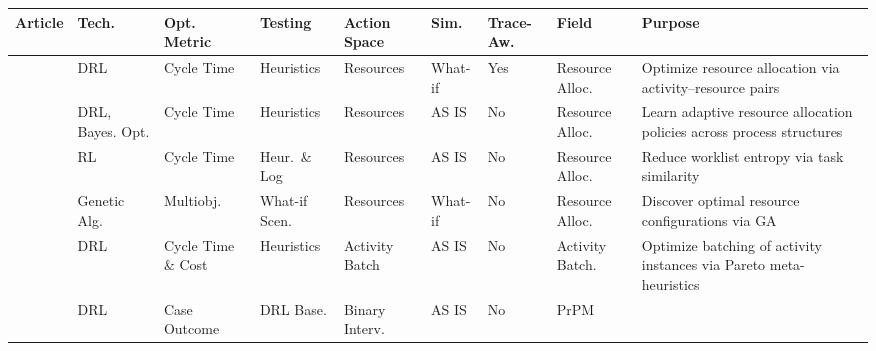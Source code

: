 \documentclass[journal,onecolumn]{IEEEtran}
\begin{document}
\begin{table}[!htbp]
\centering
\footnotesize
\setlength{\tabcolsep}{2pt}
\renewcommand{\arraystretch}{1.05}
\begin{tabularx}{\textwidth}{|>{\raggedright\arraybackslash}p{2.0cm}
                             |>{\raggedright\arraybackslash}p{1.3cm}
                             |>{\raggedright\arraybackslash}p{1.2cm}
                             |>{\raggedright\arraybackslash}p{1.3cm}
                             |>{\raggedright\arraybackslash}p{1.3cm}
                             |>{\raggedright\arraybackslash}p{1.2cm}
                             |>{\raggedright\arraybackslash}p{0.9cm}
                             |>{\raggedright\arraybackslash}p{1.2cm}
                             |>{\raggedright\arraybackslash}X|}
\hline
\textbf{Article} &
\textbf{Tech.} &
\textbf{Opt. Metric} &
\textbf{Testing} &
\textbf{Action Space} &
\textbf{Sim.} &
\textbf{Trace-Aw.} &
\textbf{Field} &
\textbf{Purpose} \\ \hline
\textbf{\citeauthor{Optimizing_Resource_Allocation_Policies}~\cite{Optimizing_Resource_Allocation_Policies}} &
DRL & Cycle Time & Heuristics & Resources & What-if & Yes & Resource Alloc. &
Optimize resource allocation via activity--resource pairs \\ \hline
\textbf{\citeauthor{Learning_policies_drl}~\cite{Learning_policies_drl}} &
DRL, Bayes. Opt. & Cycle Time & Heuristics & Resources & AS IS & No & Resource Alloc. &
Learn adaptive resource allocation policies across process structures \\ \hline
\textbf{\citeauthor{Resource_allocation_using_task_similarity}~\cite{Resource_allocation_using_task_similarity}} &
RL & Cycle Time & Heur.\ \& Log & Resources & AS IS & No & Resource Alloc. &
Reduce worklist entropy via task similarity \\ \hline
\textbf{\citeauthor{genetic_resource_allocations}~\cite{genetic_resource_allocations}} &
Genetic Alg. & Multiobj. & What-if Scen. & Resources & What-if & No & Resource Alloc. &
Discover optimal resource configurations via GA \\ \hline
\textbf{\citeauthor{Optimization_of_Activity_Batching_Policies}~\cite{Optimization_of_Activity_Batching_Policies}} &
DRL & Cycle Time \& Cost & Heuristics & Activity Batch & AS IS & No & Activity Batch. &
Optimize batching of activity instances via Pareto meta-heuristics \\ \hline
\textbf{\citeauthor{ppm_resource_constraints}~\cite{ppm_resource_constraints}} &
DRL & Case Outcome & DRL Base. & Binary Interv. & AS IS & No & PrPM &

\end{tabularx}
\end{table}
\end{document}
